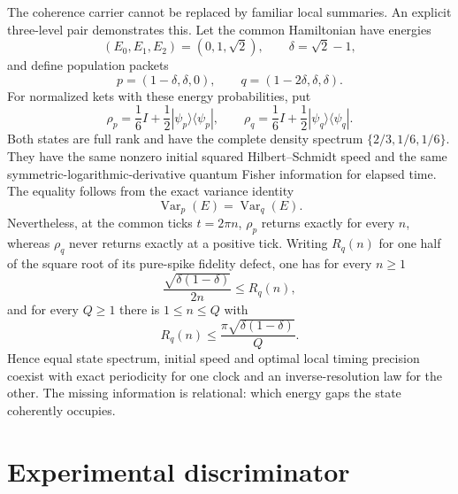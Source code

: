\documentclass[10pt]{article}
\theoremstyle{definition}
\begin{document}
The coherence carrier cannot be replaced by familiar local summaries.  An
explicit three-level pair demonstrates this.  Let the common Hamiltonian have
energies
\[
 (E_0,E_1,E_2)=(0,1,\sqrt2),\qquad \delta=\sqrt2-1,
\]
and define population packets
\[
 p=(1-\delta,\delta,0),\qquad
 q=(1-2\delta,\delta,\delta).
\]
For normalized kets with these energy probabilities, put
\begin{equation}
 \rho_p=\frac16 I+\frac12|\psi_p\rangle\!\langle\psi_p|,
 \qquad
 \rho_q=\frac16 I+\frac12|\psi_q\rangle\!\langle\psi_q|.
\label{eq:qutrit-states}
\end{equation}
Both states are full rank and have the complete density spectrum
\(\{2/3,1/6,1/6\}\).  They have the same nonzero initial squared
Hilbert--Schmidt speed and the same symmetric-logarithmic-derivative quantum
Fisher information for elapsed time.  The equality follows from the exact
variance identity
\begin{equation}
 \operatorname{Var}_{p}(E)=\operatorname{Var}_{q}(E).
\label{eq:variance-equality}
\end{equation}
Nevertheless, at the common ticks \(t=2\pi n\), \(\rho_p\) returns exactly
for every \(n\), whereas \(\rho_q\) never returns exactly at a positive tick.
Writing \(R_q(n)\) for one half of the square root of its pure-spike fidelity
defect, one has for every \(n\geq1\)
\begin{equation}
 \frac{\sqrt{\delta(1-\delta)}}{2n}\leq R_q(n),
\label{eq:qutrit-lower}
\end{equation}
and for every \(Q\geq1\) there is \(1\leq n\leq Q\) with
\begin{equation}
 R_q(n)\leq\frac{\pi\sqrt{\delta(1-\delta)}}{Q}.
\label{eq:qutrit-upper}
\end{equation}
Hence equal state spectrum, initial speed and optimal local timing precision
coexist with exact periodicity for one clock and an inverse-resolution law
for the other.  The missing information is relational: which energy gaps the
state coherently occupies.

\section*{Experimental discriminator}
\end{document}

